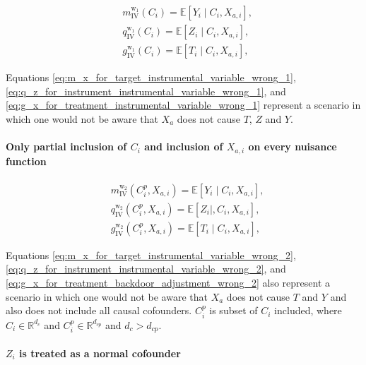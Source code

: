 \documentclass{article}
\numberwithin{equation}{section}
\begin{document}
\begin{align}
    & m_{\text{IV}}^{\text{w}_1}(C_i) = \mathbb{E}[Y_i \mid C_i, X_{a, i}],
    \label{eq:m_x_for_target_instrumental_variable_wrong_1} \\
    & q_{\text{IV}}^{\text{w}_1}(C_i) = \mathbb{E}[Z_i \mid C_i, X_{a, i}],
    \label{eq:q_z_for_instrument_instrumental_variable_wrong_1} \\
    & g_{\text{IV}}^{\text{w}_1}(C_i) = \mathbb{E}[T_i \mid C_i, X_{a, i}],
    \label{eq:g_x_for_treatment_instrumental_variable_wrong_1}
\end{align}

Equations \eqref{eq:m_x_for_target_instrumental_variable_wrong_1}, \eqref{eq:q_z_for_instrument_instrumental_variable_wrong_1}, and \eqref{eq:g_x_for_treatment_instrumental_variable_wrong_1} represent a scenario in which one would not be aware that $X_a$ does not cause $T$, $Z$ and $Y$.

\paragraph{Only partial inclusion of $C_i$ and inclusion of $X_{a, i}$ on every nuisance function}

\begin{align}
    & m_{\text{IV}}^{\text{w}_2}(C_i^{p}, X_{a, i}) = \mathbb{E}[Y_i \mid C_i, X_{a, i}],
    \label{eq:m_x_for_target_instrumental_variable_wrong_2} \\
    & q_{\text{IV}}^{\text{w}_2}(C_i^{p}, X_{a, i}) = \mathbb{E}[Z_i \mid, C_i, X_{a, i}],
    \label{eq:q_z_for_instrument_instrumental_variable_wrong_2} \\
    & g_{\text{IV}}^{\text{w}_2}(C_i^{p}, X_{a, i}) = \mathbb{E}[T_i \mid C_i, X_{a, i}],
    \label{eq:g_x_for_treatment_instrumental_variable_wrong_2}
\end{align}

Equations \eqref{eq:m_x_for_target_instrumental_variable_wrong_2}, \eqref{eq:q_z_for_instrument_instrumental_variable_wrong_2}, and \eqref{eq:g_x_for_treatment_backdoor_adjustment_wrong_2} also represent a scenario in which one would not be aware that $X_a$ does not cause $T$ and $Y$ and also does not include all causal cofounders. $C^{p}_i$ is subset of $C_i$ included, where $C_i \in \mathbb{R}^{d_c}$ and $C^{p}_i \in \mathbb{R}^{d_{cp}}$ and $d_c > d_{cp}$.

\paragraph{$Z_i$ is treated as a normal cofounder}
\end{document}

